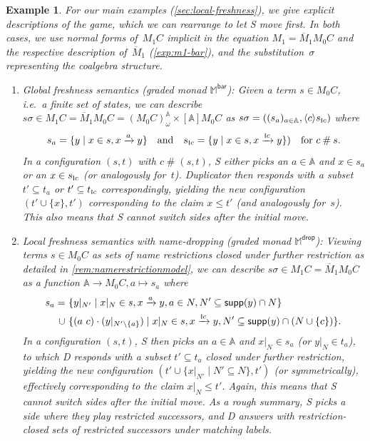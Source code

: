 \documentclass[11pt,a4paper]{amsart}
\newtheorem{example}[example]{Example}
\newcommand{\Br}{\mathsf{bar}}
\newcommand{\drop}{\mathsf{drop}}
\newcommand{\Names}{\mathbb{A}}
\newcommand{\fresh}{\mathbin{\#}}
\newcommand{\supp}{\mathsf{supp}}
\newcommand{\bind}[1]{\langle #1\rangle}
\newcommand{\mbar}{\overline{M}_1}
\theoremstyle{plain}
\newcommand{\scriptmidmid}{\hspace{0.2ex}{\rule[-0.1ex]{0.6pt}{1.1ex}}\hspace{0.2ex}}
\newcommand{\scriptnew}[1]{{\scriptmidmid}#1}
\numberwithin{equation}{section}
\newcommand{\monad}{{\mathbb{M}}}
\newcommand{\+}[1]{\mathcal{#1}\xspace}
\newcommand{\names}{\mathbb{A}}
\theoremstyle{definition}
\begin{document}
\begin{example}
  \label{exp:explicit-games}
  For our main examples (\cref{sec:local-freshness}), we give explicit
  descriptions of the game, which we can rearrange to let S move
  first.  In both cases, we use normal
  forms of~$M_1C$ implicit in the equation $M_1=\mbar M_0C$ and the
  respective description of~$\mbar$ (\autoref{exp:m1-bar}), and the
  substitution~$\sigma$ representing the coalgebra structure.
  \begin{enumerate}[wide]
  \item \emph{Global freshness semantics (graded monad\/
      $\monad^\Br$):} Given a term $s \in M_0C$, i.e.~a finite
    set of states, we can describe
    $s\sigma \in M_1 C = \mbar M_0 C=(M_0 C)^{\Names}_\omega \times
    [\Names]M_0 C$ as
    $s\sigma =((s_a)_{a\in\names}, \bind{c}s_{\scriptnew{c}})$ where
      \begin{equation*}
        s_a = \{y \mid x \in s, x \xrightarrow{a} y\} \quad\text{and}\quad s_{\scriptnew{c}} = \{y \mid x \in s, x \xrightarrow{\scriptnew{c}} y\}) \quad\text{for } c\fresh s.
      \end{equation*}
      In a configuration $(s,t)$ with $c\fresh(s,t)$, S either picks an $a \in \Names$ and $x \in s_a$ or an $x \in s_{\scriptnew{c}}$ (or analogously for~$t$).
      Duplicator then responds with a subset $t' \subseteq t_a$ or $t' \subseteq t_{\scriptnew{c}}$ correspondingly, yielding the new configuration $(t' \cup \{x\}, t')$ corresponding to the claim $x\le t'$ (and analogously for~$s$).
      This also means that S cannot switch sides after the initial move.

    \item \emph{Local freshness semantics with name-dropping (graded
        monad\/ $\monad^\drop$):} Viewing terms $s\in M_0C$ as sets of
      name restrictions closed under further restriction as detailed
      in \cref{rem:namerestrictionmodel}, we can describe
      $s\sigma \in M_1C = \mbar M_0 C$ as a function
      $\Names \to M_0 C, a \mapsto s_a$ where
      \begin{align*}
        s_a
          =~&\{ y|_{N'} \mid x|_N \in s, x \xrightarrow{a} y, a \in N, N' \subseteq \supp(y) \cap N \} \\
          \cup~&\{ (a\ c) \cdot (y|_{N' \setminus \{a\}}) \mid x|_N \in s, x \xrightarrow{\scriptnew{c}} y, N' \subseteq \supp(y) \cap (N \cup \{c\}) \}.
      \end{align*}
      In a configuration $(s, t)$, S then picks an $a \in \Names$ and
      $x|_N \in s_a$ (or $y|_N\in t_a$), to which D responds
      with a subset $t' \subseteq t_a$ closed under further
      restriction, yielding the new configuration
      $(t' \cup \{x|_{N'} \mid N' \subseteq N\}, t')$ (or
      symmetrically), effectively corresponding to the claim
      $x|_N\le t'$. Again, this means that S cannot switch sides
      after the initial move. As a rough summary, S picks a side
      where they play restricted successors, and D answers
      with restriction-closed sets of restricted successors under
      matching labels.
  \end{enumerate}
\end{example}
\end{document}
